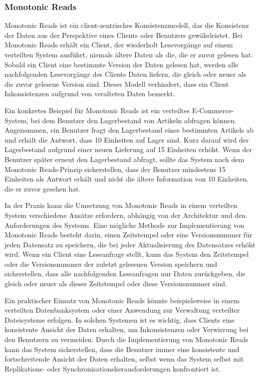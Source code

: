 \subsubsection{Monotonic Reads}

Monotonic Reads ist ein client-zentrisches Konsistenzmodell, das die Konsistenz der Daten aus der Perspektive eines Clients oder Benutzers gewährleistet. Bei Monotonic Reads erhält ein Client, der wiederholt Lesevorgänge auf einem verteilten System ausführt, niemals ältere Daten als die, die er zuvor gelesen hat. Sobald ein Client eine bestimmte Version der Daten gelesen hat, werden alle nachfolgenden Lesevorgänge des Clients Daten liefern, die gleich oder neuer als die zuvor gelesene Version sind. Dieses Modell verhindert, dass ein Client Inkonsistenzen aufgrund von veralteten Daten bemerkt.

Ein konkretes Beispiel für Monotonic Reads ist ein verteiltes E-Commerce-System, bei dem Benutzer den Lagerbestand von Artikeln abfragen können. Angenommen, ein Benutzer fragt den Lagerbestand eines bestimmten Artikels ab und erhält die Antwort, dass 10 Einheiten auf Lager sind. Kurz darauf wird der Lagerbestand aufgrund einer neuen Lieferung auf 15 Einheiten erhöht. Wenn der Benutzer später erneut den Lagerbestand abfragt, sollte das System nach dem Monotonic Reads-Prinzip sicherstellen, dass der Benutzer mindestens 15 Einheiten als Antwort erhält und nicht die ältere Information von 10 Einheiten, die er zuvor gesehen hat.

In der Praxis kann die Umsetzung von Monotonic Reads in einem verteilten System verschiedene Ansätze erfordern, abhängig von der Architektur und den Anforderungen des Systems. Eine mögliche Methode zur Implementierung von Monotonic Reads besteht darin, einen Zeitstempel oder eine Versionsnummer für jeden Datensatz zu speichern, die bei jeder Aktualisierung des Datensatzes erhöht wird. Wenn ein Client eine Leseanfrage stellt, kann das System den Zeitstempel oder die Versionsnummer der zuletzt gelesenen Version speichern und sicherstellen, dass alle nachfolgenden Leseanfragen nur Daten zurückgeben, die gleich oder neuer als dieser Zeitstempel oder diese Versionsnummer sind.

Ein praktischer Einsatz von Monotonic Reads könnte beispielsweise in einem verteilten Datenbanksystem oder einer Anwendung zur Verwaltung verteilter Dateisysteme erfolgen. In solchen Systemen ist es wichtig, dass Clients eine konsistente Ansicht der Daten erhalten, um Inkonsistenzen oder Verwirrung bei den Benutzern zu vermeiden. Durch die Implementierung von Monotonic Reads kann das System sicherstellen, dass die Benutzer immer eine konsistente und fortschreitende Ansicht der Daten erhalten, selbst wenn das System selbst mit Replikations- oder Synchronisationsherausforderungen konfrontiert ist.

